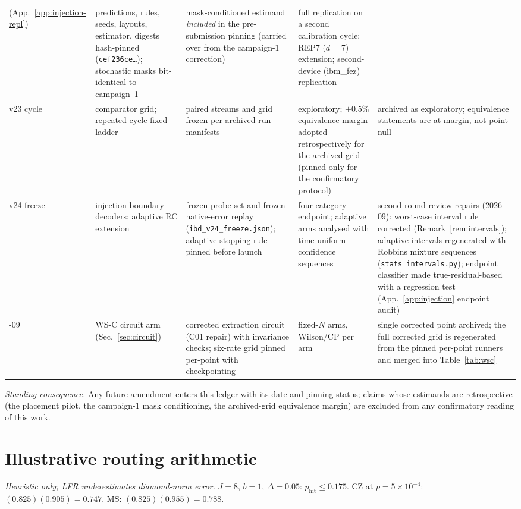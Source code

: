 \documentclass[11pt,a4paper]{article}
\begin{document}
\begin{table}[H]
\begin{tabular}{@{}p{1.4cm}p{2.7cm}p{3.8cm}p{3.2cm}p{3.4cm}@{}}
  (App.~\ref{app:injection-repl})
  & predictions, rules, seeds, layouts, estimator, digests hash-pinned
    (\texttt{cef236ce\dots}); stochastic masks bit-identical to
    campaign~1
  & mask-conditioned estimand \emph{included} in the pre-submission
    pinning (carried over from the campaign-1 correction)
  & full replication on a second calibration cycle; REP7 ($d{=}7$)
    extension; second-device (ibm\_fez) replication \\\addlinespace
v23 cycle & comparator grid; repeated-cycle fixed ladder
  & paired streams and grid frozen per archived run manifests
  & exploratory; $\pm0.5\%$ equivalence margin adopted retrospectively
    for the archived grid (pinned only for the confirmatory protocol)
  & archived as exploratory; equivalence statements are at-margin, not
    point-null \\\addlinespace
v24 freeze & injection-boundary decoders; adaptive RC extension
  & frozen probe set and frozen native-error replay
    (\texttt{ibd\_v24\_freeze.json}); adaptive stopping rule pinned
    before launch
  & four-category endpoint; adaptive arms analysed with time-uniform
    confidence sequences
  & second-round-review repairs (2026-09): worst-case interval rule
    corrected (Remark~\ref{rem:intervals}); adaptive intervals
    regenerated with Robbins mixture sequences
    (\texttt{stats\_intervals.py}); endpoint classifier made
    true-residual-based with a regression test
    (App.~\ref{app:injection} endpoint audit) \\\addlinespace
2026-09 & WS-C circuit arm (Sec.~\ref{sec:circuit})
  & corrected extraction circuit (C01 repair) with invariance checks;
    six-rate grid pinned per-point with checkpointing
  & fixed-$N$ arms, Wilson/CP per arm
  & single corrected point archived; the full corrected grid is
    regenerated from the pinned per-point runners and merged into
    Table~\ref{tab:wsc} \\\bottomrule
\end{tabular}
\end{table}

\emph{Standing consequence.} Any future amendment enters this ledger
with its date and pinning status; claims whose estimands are
retrospective (the placement pilot, the campaign-1 mask conditioning,
the archived-grid equivalence margin) are excluded from any
confirmatory reading of this work.

\section{Illustrative routing arithmetic}\label{app:routing}
\emph{Heuristic only; LFR underestimates diamond-norm error.}
$J=8$, $b=1$, $\Delta=0.05$: $p_\mathrm{hit}\le0.175$.
CZ at $p=5\times10^{-4}$: $(0.825)(0.905)=0.747$.
MS: $(0.825)(0.955)=0.788$.



\end{document}
